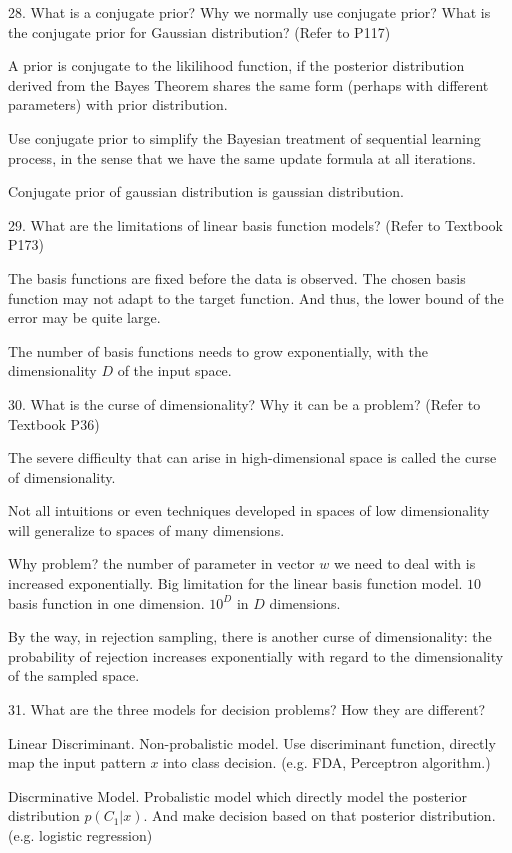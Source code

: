 \documentclass[11pt,a4paper]{article}
\begin{document}
28. What is a conjugate prior? Why we normally use conjugate prior? What is the conjugate prior for Gaussian distribution? (Refer to P117)

A prior is conjugate to the likilihood function, if the posterior distribution derived from the Bayes Theorem shares the same form (perhaps with different parameters) with prior distribution. 

    Use conjugate prior to simplify the Bayesian treatment of sequential learning process, in the sense that we have the same update formula at all iterations. 

    Conjugate prior of gaussian distribution is gaussian distribution.

29. What are the limitations of linear basis function models? (Refer to Textbook P173)

    The basis functions are fixed before the data is observed. The chosen basis function may not adapt to the target function. And thus, the lower bound of the error may be quite large.

    The number of basis functions needs to grow exponentially, with the dimensionality $D$ of the input space. 

30. What is the curse of dimensionality? Why it can be a problem? (Refer to Textbook P36)

The severe difficulty that can arise in high-dimensional space is called the curse of dimensionality. 

Not all intuitions or even techniques developed in spaces of low dimensionality will generalize to spaces of many dimensions.

Why problem? the number of parameter in vector $w$ we need to deal with is increased exponentially. 
Big limitation for the linear basis function model. $10$ basis function in one dimension. $10^D$ in $D$ dimensions.

By the way, in rejection sampling, there is another curse of dimensionality: the probability of rejection increases exponentially with regard to the dimensionality of the sampled space.

31. What are the three models for decision problems? How they are different?
    
    Linear Discriminant. Non-probalistic model. Use discriminant function, directly map the input pattern $x$ into class decision. (e.g. FDA, Perceptron algorithm.)

    Discrminative Model. Probalistic model which directly model the posterior distribution $p(C_1|x)$. And make decision based on that posterior distribution. (e.g. logistic regression)
\end{document}
